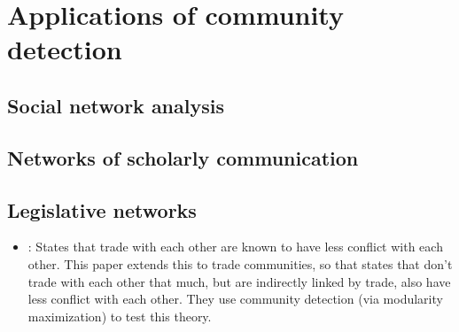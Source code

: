 \section{Applications of community
detection}\label{applications-of-community-detection}

\subsection{Social network analysis}\label{social-network-analysis}

\subsection{Networks of scholarly
communication}\label{networks-of-scholarly-communication}

\subsection{Legislative networks}\label{legislative-networks}


\begin{itemize}
\tightlist
\item
  \autocite{lupu_trading_2013}: States that trade with each other are
  known to have less conflict with each other. This paper extends this
  to trade communities, so that states that don't trade with each other
  that much, but are indirectly linked by trade, also have less conflict
  with each other. They use community detection (via modularity
  maximization) to test this theory.
\end{itemize}


